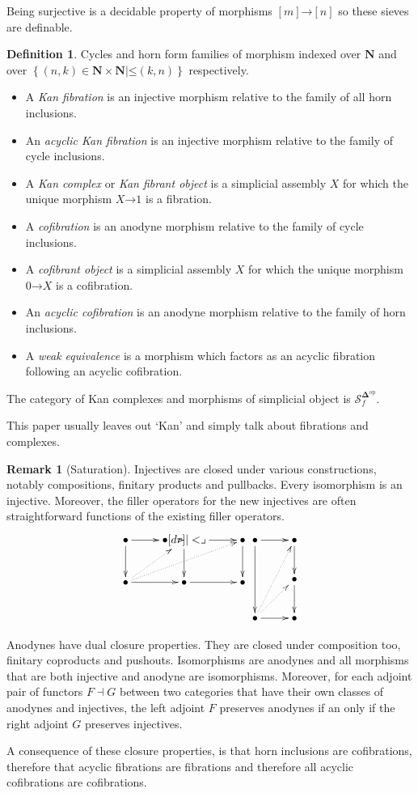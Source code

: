 \documentclass{amsart}
\theoremstyle{plain}
\theoremstyle{definition}
\newtheorem{defin}[theorem]{Definition}
\newtheorem{remark}[theorem]{Remark}
\newcommand\cat\mathcal
\newcommand\set[1]{\left\{#1\right\}}
\newcommand\nno{\mathbf N}
\newcommand\dual{^{\mathrm{op}}}
\newcommand\simCat{\mathbf\Delta}
\newcommand\s{^{\simCat\dual}}
\renewcommand\to{\mathord\rightarrow}
\newcommand\f{_f}
\begin{document}
Being surjective is a decidable property of morphisms $[m]\to[n]$ so these sieves are definable. 

\begin{defin} Cycles and horn form families of morphism indexed over $\nno$ and over $\set{(n,k)\in\nno\times\nno| \mathord\leq(k,n) }$ respectively.
\begin{itemize}
\item A \emph{Kan fibration} is an injective morphism relative to the family of all horn inclusions.
\item An \emph{acyclic Kan fibration} is an injective morphism relative to the family of cycle inclusions.
\item A \emph{Kan complex} or \emph{Kan fibrant object} is a simplicial assembly $X$ for which the unique morphism $X\to 1$ is a fibration.
\item A \emph{cofibration} is an anodyne morphism relative to the family of cycle inclusions.
\item A \emph{cofibrant object} is a simplicial assembly $X$ for which the unique morphism $0\to X$ is a cofibration.
\item An \emph{acyclic cofibration} is an anodyne morphism relative to the family of horn inclusions.
\item A \emph{weak equivalence} is a morphism which factors as an acyclic fibration following an acyclic cofibration.
\end{itemize}\label{Kan}
The category of Kan complexes and morphisms of simplicial object is $\cat S\s\f$.
\end{defin}
This paper usually leaves out `Kan' and simply talk about fibrations and complexes. 

\begin{remark}[Saturation] Injectives are closed under various constructions, notably compositions, finitary products and pullbacks. Every isomorphism is an injective. Moreover, the filler operators for the new injectives are often straightforward functions of the existing filler operators.
\[\xymatrix{
\bullet \ar[d]\ar[r] & \bullet \ar[d]\ar[r]\pb & \bullet\ar[d] \\
\bullet \ar[r]\ar@{.>}[ur] \ar@{.>}[urr] &\bullet\ar[r] & \bullet
}
\xymatrix{
\bullet\ar[dd]\ar[r] & \bullet\ar[d]\\
& \bullet \ar[d]\\
\bullet\ar@{.>}[ur]\ar@{.>}[uur] \ar[r] & \bullet
}\]

Anodynes have dual closure properties. They are closed under composition too, finitary coproducts and pushouts. Isomorphisms are anodynes and all morphisms that are both injective and anodyne are isomorphisms. Moreover, for each adjoint pair of functors $F\dashv G$ between two categories that have their own classes of anodynes and injectives, the left adjoint $F$ preserves anodynes if an only if the right adjoint $G$ preserves injectives.

A consequence of these closure properties, is that horn inclusions are cofibrations, therefore that acyclic fibrations are fibrations and therefore all acyclic cofibrations are cofibrations.
\end{remark}
\end{document}
